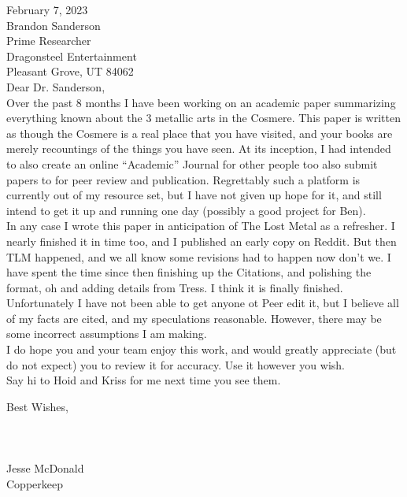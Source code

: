 \documentclass[conference]{IEEEtran}
\begin{document}
\begin{adjustwidth}{40pt}{80pt}
\noindent{}February 7, 2023\\

\noindent{}Brandon Sanderson\\
Prime Researcher\\
Dragonsteel Entertainment\\
Pleasant Grove, UT 84062\\

\noindent{}Dear Dr. Sanderson,\\

Over the past 8 months I have been working on an academic paper summarizing everything known about the 3 metallic arts in the Cosmere.  This paper is written as though the Cosmere is a real place that you have visited, and your books are merely recountings of the things you have seen.  At its inception, I had intended to also create an online ``Academic'' Journal for other people too also submit papers to for peer review and publication.  Regrettably such a platform is currently out of my resource set, but I have not given up hope for it, and still intend to get it up and running one day (possibly a good project for Ben).\\

In any case I wrote this paper in anticipation of The Lost Metal as a refresher.  I nearly finished it in time too, and I published an early copy on Reddit.  But then TLM happened, and we all know some revisions had to happen now don't we.  I have spent the time since then finishing up the Citations, and polishing the format, oh and adding details from Tress.  I think it is finally finished.\\

Unfortunately I have not been able to get anyone ot Peer edit it, but I believe all of my facts are cited, and my speculations reasonable.  However, there may be some incorrect assumptions I am making.\\

I do hope you and your team enjoy this work, and would greatly appreciate (but do not expect) you to review it for accuracy.  Use it however you wish.\\

Say hi to Hoid and Kriss for me next time you see them.\\


\end{adjustwidth}
\vspace{\fill}
\begin{adjustwidth}{100pt}{00pt}
	\noindent{}Best Wishes,\\\\\\\\
	
	
	
	\noindent{}Jesse McDonald\\ Copperkeep
\end{adjustwidth}
\end{document}
